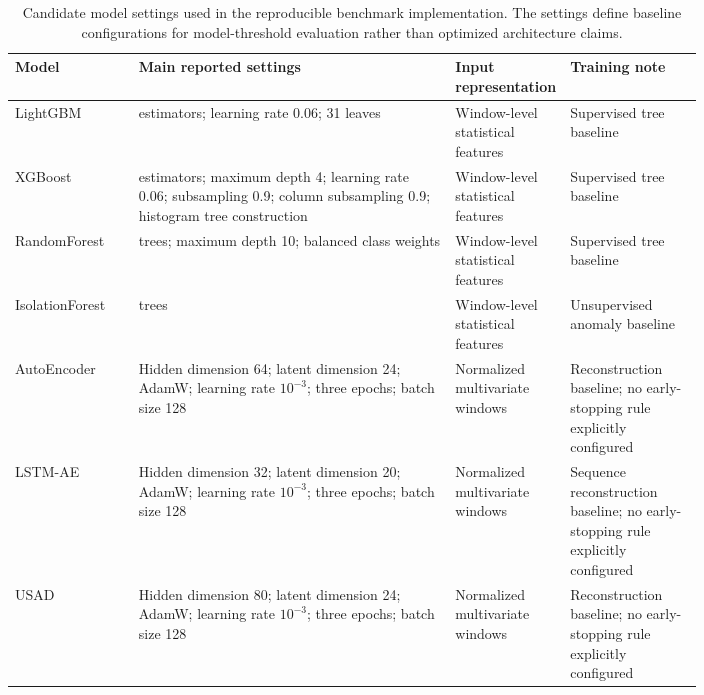 \begin{table}[!htbp]
\centering
\scriptsize
\setlength{\tabcolsep}{3.2pt}
\renewcommand{\arraystretch}{1.08}
\caption{Candidate model settings used in the reproducible benchmark implementation. The settings define baseline configurations for model-threshold evaluation rather than optimized architecture claims.}
\label{tab:model-parameters}
\begin{tabularx}{\linewidth}{@{}>{\RaggedRight\arraybackslash}p{0.18\linewidth}>{\RaggedRight\arraybackslash}p{0.46\linewidth}>{\RaggedRight\arraybackslash}p{0.16\linewidth}>{\RaggedRight\arraybackslash}X@{}}
\toprule
Model & Main reported settings & Input representation & Training note \\
\midrule
LightGBM & 70 estimators; learning rate 0.06; 31 leaves & Window-level statistical features & Supervised tree baseline \\
XGBoost & 60 estimators; maximum depth 4; learning rate 0.06; subsampling 0.9; column subsampling 0.9; histogram tree construction & Window-level statistical features & Supervised tree baseline \\
RandomForest & 80 trees; maximum depth 10; balanced class weights & Window-level statistical features & Supervised tree baseline \\
IsolationForest & 80 trees & Window-level statistical features & Unsupervised anomaly baseline \\
AutoEncoder & Hidden dimension 64; latent dimension 24; AdamW; learning rate $10^{-3}$; three epochs; batch size 128 & Normalized multivariate windows & Reconstruction baseline; no early-stopping rule explicitly configured \\
LSTM-AE & Hidden dimension 32; latent dimension 20; AdamW; learning rate $10^{-3}$; three epochs; batch size 128 & Normalized multivariate windows & Sequence reconstruction baseline; no early-stopping rule explicitly configured \\
USAD & Hidden dimension 80; latent dimension 24; AdamW; learning rate $10^{-3}$; three epochs; batch size 128 & Normalized multivariate windows & Reconstruction baseline; no early-stopping rule explicitly configured \\
\bottomrule
\end{tabularx}
\end{table}
